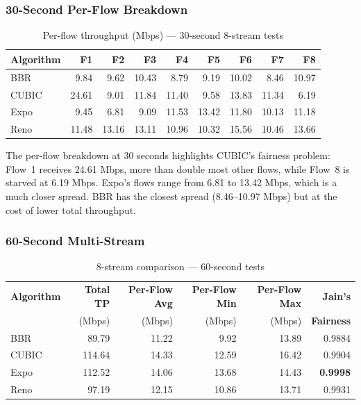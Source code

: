 \documentclass[11pt]{article}
\begin{document}
\subsubsection*{30-Second Per-Flow Breakdown}

\begin{table}[H]
\centering
\caption{Per-flow throughput (Mbps) — 30-second 8-stream tests}
\label{tab:perflow30}
\small
\begin{tabular}{l r r r r r r r r}
\toprule
\textbf{Algorithm} & \textbf{F1} & \textbf{F2} & \textbf{F3} & \textbf{F4} & \textbf{F5} & \textbf{F6} & \textbf{F7} & \textbf{F8} \\
\midrule
BBR   & 9.84  & 9.62  & 10.43 & 8.79  & 9.19  & 10.02 & 8.46  & 10.97 \\
CUBIC & 24.61 & 9.01  & 11.84 & 11.40 & 9.58  & 13.83 & 11.34 & 6.19  \\
\rowcolor{blue!8}
Expo  & 9.45  & 6.81  & 9.09  & 11.53 & 13.42 & 11.80 & 10.13 & 11.18 \\
Reno  & 11.48 & 13.16 & 13.11 & 10.96 & 10.32 & 15.56 & 10.46 & 13.66 \\
\bottomrule
\end{tabular}
\end{table}

The per-flow breakdown at 30 seconds highlights CUBIC's fairness problem: Flow~1 receives 24.61 Mbps, more than double most other flows, while Flow~8 is starved at 6.19 Mbps. Expo's flows range from 6.81 to 13.42 Mbps, which is a much closer spread. BBR has the closest spread (8.46--10.97 Mbps) but at the cost of lower total throughput.


\subsubsection*{60-Second Multi-Stream}

\begin{table}[H]
\centering
\caption{8-stream comparison — 60-second tests}
\label{tab:multi60}
\begin{tabular}{l r r r r r}
\toprule
\textbf{Algorithm} & \textbf{Total TP} & \textbf{Per-Flow Avg} & \textbf{Per-Flow Min} & \textbf{Per-Flow Max} & \textbf{Jain's} \\
                    & (Mbps)            & (Mbps)                & (Mbps)                & (Mbps)                & \textbf{Fairness} \\
\midrule
BBR   & 89.79  & 11.22  & 9.92  & 13.89 & 0.9884 \\
CUBIC & 114.64 & 14.33  & 12.59 & 16.42 & 0.9904 \\
\rowcolor{blue!8}
Expo  & 112.52 & 14.06  & 13.68 & 14.43 & \textbf{0.9998} \\
Reno  & 97.19  & 12.15  & 10.86 & 13.71 & 0.9931 \\
\bottomrule
\end{tabular}
\end{table}
\end{document}
